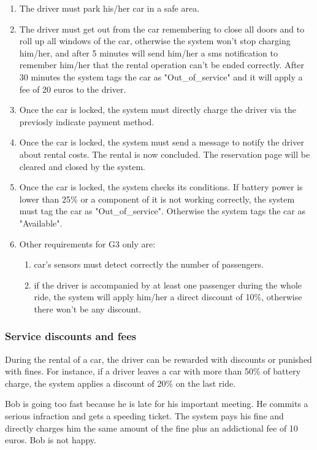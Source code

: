 \begin{enumerate}
	\item The driver must park his/her car in a safe area.
	\item The driver must get out from the car remembering to close all doors and to roll up all windows of the car, otherwise the system won't stop charging him/her, and after 5 minutes will send him/her a sms notification to remember him/her that the rental operation can't be ended correctly.
	After 30 minutes the system tags the car as "Out\_of\_service" and it will apply a fee of 20 euros to the driver.
	\item Once the car is locked, the system must directly charge the driver via the previosly indicate payment method.
	\item Once the car is locked, the system must send a message to notify the driver about rental costs. The rental is now concluded. The reservation page will be cleared and closed by the system.
	\item Once the car is locked, the system checks its conditions. If battery power is lower  than 25\% or a component of it is not working correctly, the system must tag the car as "Out\_of\_service". Otherwise the system tags the car as "Available".
	\item Other requirements for G3 only are:
	\begin{enumerate}
		\item car's sensors must detect correctly the number of passengers.
		\item if the driver is accompanied by at least one passenger during the whole ride, the system will apply him/her a direct discount of 10\%, otherwise there won't be any discount.
	\end{enumerate}
\end{enumerate}

\subsubsection{Service discounts and fees}

During the rental of a car, the driver can be rewarded with discounts or punished with fines.
For instance, if a driver leaves a car with more than 50\% of battery charge, the system applies a discount of 20\% on the last ride.


Bob is going too fast because he is late for his important meeting. He commits a serious infraction and gets a speeding ticket. The system pays his fine and directly charges him the same amount of the fine plus an addictional fee of 10 euros. Bob is not happy.

